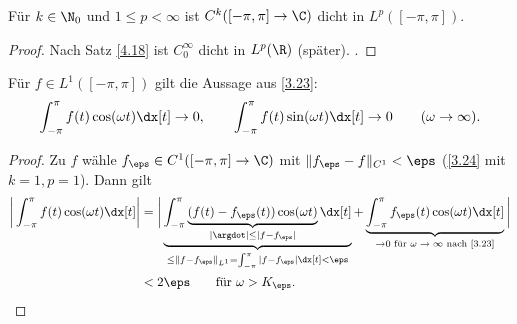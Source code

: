 \begin{lem} \label{3.24}
	Für $k \in \N_0$ und $1 \le p < \infty$ ist $C^k([-\pi, \pi] \to \C)$ dicht in $L^p([-\pi, \pi])$.
	\begin{proof}
		Nach Satz \ref{4.18} ist $C_0^\infty$ dicht in $L^p(\R)$ (später). . 
	\end{proof}
\end{lem}

\begin{st} \label{3.25}
	Für $f \in L^1([-\pi, \pi])$ gilt die Aussage aus \ref{3.23}:
	\[
		\int_{-\pi}^{\pi} f(t) \cos(\omega t) \dx[t] \to 0, \qquad
		\int_{-\pi}^{\pi} f(t) \sin(\omega t) \dx[t] \to 0 \qquad (\omega \to \infty).
	\]
	\begin{proof}
		Zu $f$ wähle $f_\eps \in C^1 ([-\pi,\pi] \to \C)$ mit $\|f_\eps - f\|_{C^1} < \eps$ (\ref{3.24} mit $k=1, p=1$).
		Dann gilt
		\begin{align*}
			\bigg|\int_{-\pi}^{\pi} f(t) \cos(\omega t) \dx[t] \bigg|
			&= \bigg| \underbrace{\int_{-\pi}^{\pi} \underbrace{(f(t) - f_\eps(t)) \cos(\omega t)}_{|\argdot| \le |f-f_\eps|} \dx[t]}_{\le \|f - f_\eps\|_{L^1} = \int_{-\pi}^\pi |f-f_\eps| \dx[t] < \eps} + \underbrace{\int_{-\pi}^{\pi} f_\eps (t) \cos(\omega t) \dx[t]}_{\to 0 \text{ für $\omega \to \infty$ nach \ref{3.23}}} \bigg| \\
			&< 2\eps \qquad \text{für $\omega > K_\eps$.}
		\end{align*}
	\end{proof}
\end{st}

